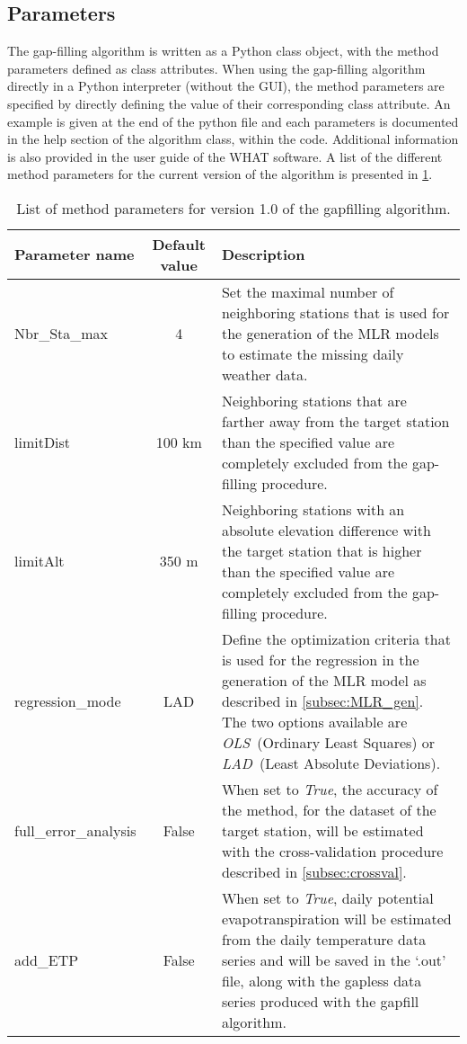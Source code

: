 \documentclass[TechnicalNoteMeteo.tex]{subfiles}
\begin{document}
\subsection{Parameters}\label{sec:parameters}

The gap-filling algorithm is written as a Python class object, with the method parameters defined as class attributes. When using the gap-filling algorithm directly in a Python interpreter (without the GUI), the method parameters are specified by directly defining the value of their corresponding class attribute. An example is given at the end of the python file and each parameters is documented in the help section of the algorithm class, within the code. Additional information is also provided in the user guide of the WHAT software. A list of the different method parameters for the current version of the algorithm is presented in \cref{tab:method_parameter}.

\begin{table}[!bh]
    \centering
    \caption{List of method parameters for version 1.0 of the gapfilling algorithm.}
    \begin{tabular}{lcp{10.5cm}}
        \toprule
        Parameter name & Default value & Description\\
        \midrule
        Nbr\_Sta\_max & 4 & Set the maximal number of neighboring stations that is used for the generation of the MLR models to estimate the missing daily weather data.\\[1em]
        limitDist & 100 km & Neighboring stations that are farther away from the target station than the specified value are completely excluded from the gap-filling procedure. \\[1em]
        limitAlt & 350 m & Neighboring stations with an absolute elevation difference with the target station that is higher than the specified value are completely excluded from the gap-filling procedure.\\[1em]
        regression\_mode & LAD & Define the optimization criteria that is used for the regression in the generation of the MLR model as described in \cref{subsec:MLR_gen}. The two options available are \emph{OLS}~(Ordinary Least Squares) or \emph{LAD}~(Least Absolute Deviations). \\[1em]
        full\_error\_analysis & False & When set to \emph{True}, the accuracy of the method, for the dataset of the target station, will be estimated with the cross-validation procedure described in \cref{subsec:crossval}. \\[1em]
        add\_ETP & False & When set to \emph{True}, daily potential evapotranspiration will be estimated from the daily temperature data series and will be saved in the `.out' file, along with the gapless data series produced with the gapfill algorithm. \\
        \bottomrule
    \end{tabular}
    \label{tab:method_parameter}
\end{table}
\end{document}
